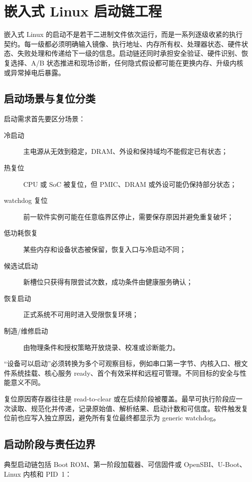 \chapter{嵌入式 Linux 启动链工程}
\label{chap:linux-boot-chain}

嵌入式 Linux 的启动不是若干二进制文件依次运行，而是一系列逐级收紧的执行契约。每一级都必须明确输入镜像、执行地址、内存所有权、处理器状态、硬件状态、失败处理和传递给下一级的信息。启动链还同时承担安全验证、硬件识别、恢复选择、A/B 状态推进和现场诊断，任何隐式假设都可能在更换内存、升级内核或异常掉电后暴露。

\section{启动场景与复位分类}

启动需求首先要区分场景：

\begin{description}
  \item[冷启动] 主电源从无效到稳定，DRAM、外设和保持域均不能假定已有状态；
  \item[热复位] CPU 或 SoC 被复位，但 PMIC、DRAM 或外设可能仍保持部分状态；
  \item[watchdog 复位] 前一软件实例可能在任意临界区停止，需要保存原因并避免重复破坏；
  \item[低功耗恢复] 某些内存和设备状态被保留，恢复入口与冷启动不同；
  \item[候选试启动] 新槽位只获得有限尝试次数，成功条件由健康服务确认；
  \item[恢复启动] 正式系统不可用时进入受限恢复环境；
  \item[制造/维修启动] 由物理条件和授权策略开放烧录、校准或诊断能力。
\end{description}

“设备可以启动”必须转换为多个可观察目标，例如串口第一字节、内核入口、根文件系统挂载、核心服务 ready、首个有效采样和远程可管理。不同目标的安全与性能意义不同。

复位原因寄存器往往是 read-to-clear 或在后续阶段被覆盖。最早可执行阶段应一次读取、规范化并传递，记录原始值、解析结果、启动计数和可信度。软件触发复位前也应写入独立原因，避免所有复位最终都显示为 generic watchdog。

\section{启动阶段与责任边界}

典型启动链包括 Boot ROM、第一阶段加载器、可信固件或 OpenSBI、U-Boot、Linux 内核和 PID~1：

